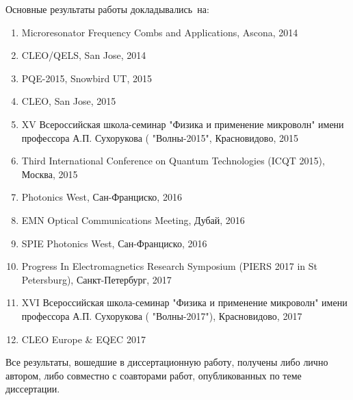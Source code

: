 {\probation}
Основные результаты работы докладывались~на:
\begin{enumerate}
  \item Microresonator Frequency Combs and Applications, Ascona, 2014
  \item CLEO/QELS, San Jose, 2014
  \item PQE-2015, Snowbird UT, 2015
  \item CLEO, San Jose, 2015
  \item XV Всероссийская школа-семинар "Физика и применение микроволн" имени профессора А.П. Сухорукова ( "Волны-2015", Красновидово, 2015
  \item Third International Conference on Quantum Technologies (ICQT 2015), Москва, 2015
  \item Photonics West, Сан-Франциско, 2016
  \item EMN Optical Communications Meeting, Дубай, 2016
  \item SPIE Photonics West, Сан-Франциско, 2016
  \item Progress In Electromagnetics Research Symposium (PIERS 2017 in St Petersburg), Санкт-Петербург, 2017
  \item XVI Всероссийская школа-семинар "Физика и применение микроволн" имени профессора А.П. Сухорукова ( "Волны-2017"), Красновидово, 2017
  \item CLEO Europe & EQEC 2017
\end{enumerate}


{\contribution} Все результаты, вошедшие в диссертационную работу, получены либо лично
автором, либо совместно с соавторами работ, опубликованных по теме диссертации.



